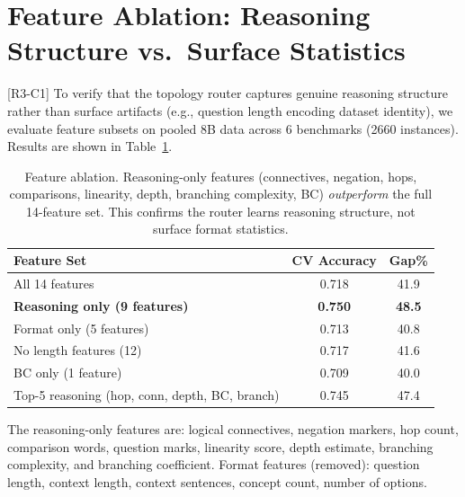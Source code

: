 \documentclass[11pt]{article}
\begin{document}
{\color{reviewerpurple}
\section{Feature Ablation: Reasoning Structure vs.\ Surface Statistics}
\label{app:feature_ablation}

[R3-C1] To verify that the topology router captures genuine reasoning structure rather than surface artifacts (e.g., question length encoding dataset identity), we evaluate feature subsets on pooled 8B data across 6 benchmarks (2660 instances). Results are shown in Table~\ref{tab:feature_ablation_app}.

\begin{table}[h]
\centering
\small
\begin{tabular}{lcc}
\toprule
\textbf{Feature Set} & \textbf{CV Accuracy} & \textbf{Gap\%} \\
\midrule
All 14 features & 0.718 & 41.9 \\
\textbf{Reasoning only (9 features)} & \textbf{0.750} & \textbf{48.5} \\
Format only (5 features) & 0.713 & 40.8 \\
No length features (12) & 0.717 & 41.6 \\
BC only (1 feature) & 0.709 & 40.0 \\
Top-5 reasoning (hop, conn, depth, BC, branch) & 0.745 & 47.4 \\
\bottomrule
\end{tabular}
\caption{Feature ablation. Reasoning-only features (connectives, negation, hops, comparisons, linearity, depth, branching complexity, BC) \emph{outperform} the full 14-feature set. This confirms the router learns reasoning structure, not surface format statistics.}
\label{tab:feature_ablation_app}
\end{table}

The reasoning-only features are: logical connectives, negation markers, hop count, comparison words, question marks, linearity score, depth estimate, branching complexity, and branching coefficient. Format features (removed): question length, context length, context sentences, concept count, number of options.
}
\end{document}

